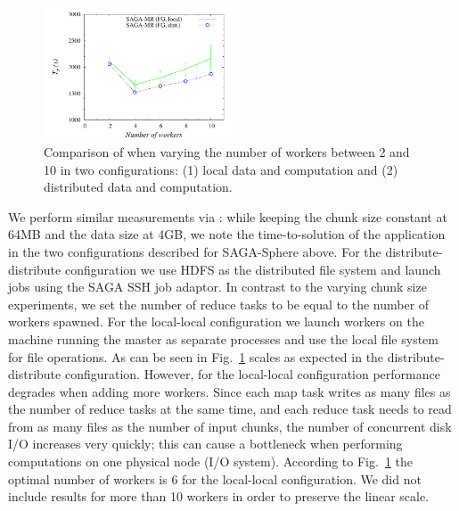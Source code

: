 \documentclass[3p,twocolumn]{elsarticle}
\begin{document}
\begin{figure}[htb!]
 \dnnn\dnnn
 \includegraphics[width=0.5\textwidth]{figures/sagamr_varying_workers.pdf}
 \caption{
   Comparison of \sagamapreduce when varying the number of workers
   between 2 and 10 in two configurations: (1) local data and computation
   and (2) distributed data and computation.
   \label{fig:sagamr_varying_workers}
   }
\end{figure}

We perform similar measurements via \sagamapreduce: while keeping the
chunk size constant at 64MB and the data size at 4GB, we note the
time-to-solution of the \wc application in the two configurations
described for SAGA-Sphere above.  For the distribute-distribute
configuration we use HDFS as the distributed file system and launch
jobs using the SAGA SSH job adaptor.  In contrast to the varying chunk
size experiments, we set the number of reduce tasks to be equal to the
number of workers spawned.   For the local-local configuration we launch
workers on the machine running the master as separate processes and
use the local file system for file operations.  As can be seen in
Fig.~\ref{fig:sagamr_varying_workers} \sagamapreduce scales as
expected in the distribute-distribute configuration.  However, for the
local-local configuration performance degrades when adding more
workers.  Since each map task writes as many files as the number of
reduce tasks at the same time, and each reduce task needs to read from
as many files as the number of input chunks, the number of concurrent
disk I/O increases very quickly; this can cause a
bottleneck when performing computations on one physical node (I/O
system).  According to Fig.~\ref{fig:sagamr_varying_workers} the
optimal number of workers is 6 for the local-local configuration.  We
did not include results for more than 10 workers in order to preserve
the linear
scale. %
\end{document}
